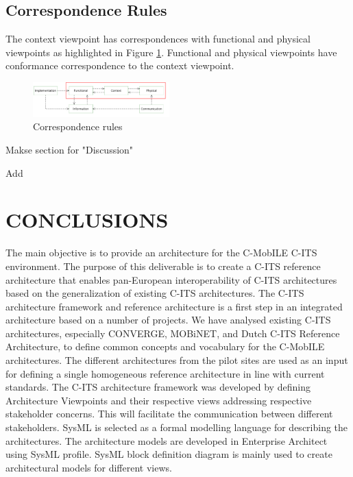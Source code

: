\documentclass[letterpaper, 10 pt, conference]{ieeeconf}  %
\begin{document}
\subsection{Correspondence Rules}

The context viewpoint has correspondences with functional and physical viewpoints as highlighted in Figure \ref{correspondence_rules}. Functional and physical viewpoints have conformance correspondence to the context viewpoint.

\begin{figure}[ht!]
	\centering
	\includegraphics[width=0.47\textwidth]{correspondence_rules}
	\caption{Correspondence rules}
	\label{correspondence_rules}
	\centering
\end{figure}

Makse section for "Discussion"

Add

\section{CONCLUSIONS}

The main objective is to provide an architecture for the C-MobILE C-ITS environment. The purpose of this deliverable is to create a C-ITS reference architecture that enables pan-European interoperability of C-ITS architectures based on the generalization of existing C-ITS architectures. The C-ITS architecture framework and reference architecture is a first step in an integrated architecture based on a number of projects. We have analysed existing C-ITS architectures, especially CONVERGE, MOBiNET, and Dutch C-ITS Reference Architecture, to define common concepts and vocabulary for the C-MobILE architectures. The different architectures from the pilot sites are used as an input for defining a single homogeneous reference architecture in line with current standards.
The C-ITS architecture framework was developed by defining Architecture Viewpoints and their respective views addressing respective stakeholder concerns. This will facilitate the communication between different stakeholders. SysML is selected as a formal modelling language for describing the architectures. The architecture models are developed in Enterprise Architect using SysML profile. SysML block definition diagram is mainly used to create architectural models for different views.
\end{document}
